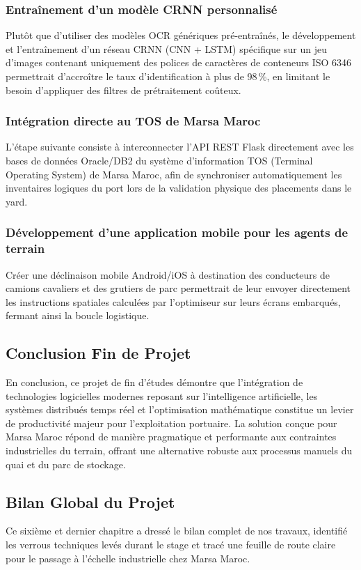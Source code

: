 \documentclass[12pt,a4paper]{article}
\begin{document}
\subsubsection{Entraînement d'un modèle CRNN personnalisé}
Plutôt que d'utiliser des modèles OCR génériques pré-entraînés, le développement et l'entraînement d'un réseau CRNN (CNN + LSTM) spécifique sur un jeu d'images contenant uniquement des polices de caractères de conteneurs ISO 6346 permettrait d'accroître le taux d'identification à plus de 98\,\%, en limitant le besoin d'appliquer des filtres de prétraitement coûteux.

\subsubsection{Intégration directe au TOS de Marsa Maroc}
L'étape suivante consiste à interconnecter l'API REST Flask directement avec les bases de données Oracle/DB2 du système d'information TOS (Terminal Operating System) de Marsa Maroc, afin de synchroniser automatiquement les inventaires logiques du port lors de la validation physique des placements dans le yard.

\subsubsection{Développement d'une application mobile pour les agents de terrain}
Créer une déclinaison mobile Android/iOS à destination des conducteurs de camions cavaliers et des grutiers de parc permettrait de leur envoyer directement les instructions spatiales calculées par l'optimiseur sur leurs écrans embarqués, fermant ainsi la boucle logistique.

\subsection{Conclusion Fin de Projet}

En conclusion, ce projet de fin d'études démontre que l'intégration de technologies logicielles modernes reposant sur l'intelligence artificielle, les systèmes distribués temps réel et l'optimisation mathématique constitue un levier de productivité majeur pour l'exploitation portuaire. La solution conçue pour Marsa Maroc répond de manière pragmatique et performante aux contraintes industrielles du terrain, offrant une alternative robuste aux processus manuels du quai et du parc de stockage.

\subsection{Bilan Global du Projet}
Ce sixième et dernier chapitre a dressé le bilan complet de nos travaux, identifié les verrous techniques levés durant le stage et tracé une feuille de route claire pour le passage à l'échelle industrielle chez Marsa Maroc.
\end{document}
